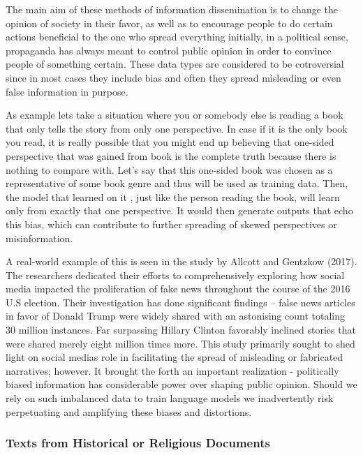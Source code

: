 The main aim of these methods of information dissemination is to change the opinion of society in their favor, as well as to encourage people to do certain actions beneficial to the one who spread everything initially, in a political sense, propaganda has always meant to control public opinion in order to convince people of something certain. These data types are considered to be cotroversial since in most cases they include bias and often they spread misleading or even false information in purpose. 

As example lets take a situation where you or somebody else is reading a book that only tells the story from only one perspective. In case if it is the only book you read, it is really possible that you might end up believing that one-sided perspective that was gained from  book is the complete truth because there is nothing to compare with. Let's say that this one-sided book was chosen as a representative of some book genre and thus will be used as training data. Then, the model that learned on it , just like the person reading the book, will learn only from exactly that one perspective. It would then generate outputs that echo this bias, which can contribute to further spreading of skewed perspectives or misinformation.

A real-world example of this is seen in the study by Allcott and Gentzkow (2017)\cite{ha2017}. The researchers dedicated their efforts to comprehensively exploring how social media impacted the proliferation of fake news throughout the course of the 2016 U.S election. Their investigation has done significant findings – false news articles in favor of Donald Trump were widely shared with an astonising count totaling 30 million instances. Far surpassing Hillary Clinton favorably inclined stories that were shared merely eight million times more. This study primarily sought to shed light on social medias role in facilitating the spread of misleading or fabricated narratives; however.  It brought the forth an important realization - politically biased information has considerable power over shaping public opinion. Should we rely on such imbalanced data to train language models we inadvertently risk perpetuating and amplifying these biases and distortions.
\subsubsection{Texts from Historical or Religious Documents}

